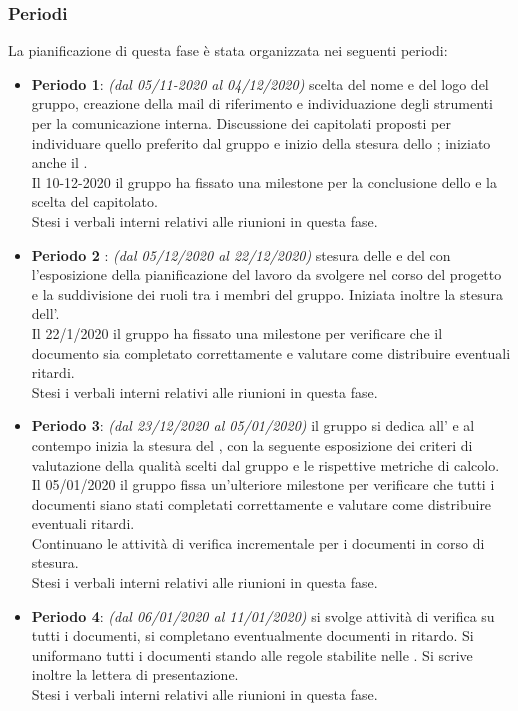 \subsubsection{Periodi}
La pianificazione di questa fase è stata organizzata nei seguenti periodi:
\begin{itemize}
\item \textbf{Periodo 1}: \textit{(dal 05/11-2020 al 04/12/2020)} scelta del nome e del logo del gruppo, creazione della mail di riferimento e individuazione degli strumenti per la comunicazione interna. Discussione dei capitolati proposti per individuare quello preferito dal gruppo e inizio della stesura dello \textit{\SdF{}} ; iniziato anche il \Glossario. \\Il 10-12-2020 il gruppo ha fissato una milestone\glo{} per la conclusione dello \textit{\SdF{}} e la scelta del capitolato.\\Stesi i verbali interni relativi alle riunioni in questa fase.
\item \textbf{Periodo 2 }: \textit{(dal 05/12/2020 al 22/12/2020)} stesura delle \textit{\NdP{}} e del \textit{\PdP{}} con l'esposizione della pianificazione del lavoro da svolgere nel corso del progetto e la suddivisione dei ruoli tra i membri del gruppo. Iniziata inoltre la stesura dell'\textit{\AdR{}}.\\Il 22/1/2020 il gruppo ha fissato una milestone per verificare che il documento \textit{\NdP{}} sia completato correttamente e valutare come distribuire eventuali ritardi.\\Stesi i verbali interni relativi alle riunioni in questa fase.
\item \textbf{Periodo 3}: \textit{(dal 23/12/2020 al 05/01/2020)} il gruppo si dedica all'\textit{\AdR{}} e al contempo inizia la stesura del \textit{\PdQ{}}, con la seguente esposizione dei criteri di valutazione della qualità scelti dal gruppo e le rispettive metriche\glo{} di calcolo.\\Il 05/01/2020 il gruppo fissa un'ulteriore milestone per verificare che tutti i documenti siano stati completati correttamente e valutare come distribuire eventuali ritardi.\\Continuano le attività di verifica incrementale per i documenti in corso di stesura.\\Stesi i verbali interni relativi alle riunioni in questa fase.
\item \textbf{Periodo 4}: \textit{(dal 06/01/2020 al 11/01/2020)} si svolge attività di verifica su tutti i documenti, si completano eventualmente documenti in ritardo. Si uniformano tutti i documenti stando alle regole stabilite nelle \textit{\NdP{}}. Si scrive inoltre la lettera di presentazione.\\Stesi i verbali interni relativi alle riunioni in questa fase.
\end{itemize}


